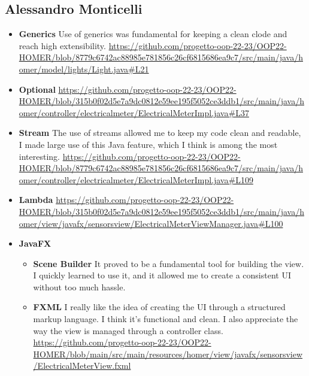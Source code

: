 \subsection {Alessandro Monticelli}
\begin{itemize}
    \item \textbf{Generics} Use of generics was fundamental for keeping a clean clode and reach high extensibility.
                            \url {https://github.com/progetto-oop-22-23/OOP22-HOMER/blob/8779c6742ac88985e781856c26cf6815686ea9c7/src/main/java/homer/model/lights/Light.java#L21}
    \item \textbf{Optional}
                            \url {https://github.com/progetto-oop-22-23/OOP22-HOMER/blob/315b0f02d5e7a9dc0812e59ee195f5052ce3ddb1/src/main/java/homer/controller/electricalmeter/ElectricalMeterImpl.java#L37}
    \item \textbf{Stream} The use of streams allowed me to keep my code clean and readable, I made large use of this Java feature, 
                            which I think is among the most interesting.
                            \url {https://github.com/progetto-oop-22-23/OOP22-HOMER/blob/8779c6742ac88985e781856c26cf6815686ea9c7/src/main/java/homer/controller/electricalmeter/ElectricalMeterImpl.java#L109}
    \item \textbf{Lambda}
                            \url {https://github.com/progetto-oop-22-23/OOP22-HOMER/blob/315b0f02d5e7a9dc0812e59ee195f5052ce3ddb1/src/main/java/homer/view/javafx/sensorsview/ElectricalMeterViewManager.java#L100}
    \item \textbf{JavaFX}
        \begin{itemize}
            \item \textbf{Scene Builder} It proved to be a fundamental tool for building the view. I quickly learned to use it, 
                                            and it allowed me to create a consistent UI without too much hassle.
            \item \textbf{FXML} I really like the idea of creating the UI through a structured markup language. I think it's functional and clean.
                                I also appreciate the way the view is managed through a controller class.
                                \url {https://github.com/progetto-oop-22-23/OOP22-HOMER/blob/main/src/main/resources/homer/view/javafx/sensorsview/ElectricalMeterView.fxml}
        \end{itemize}
\end{itemize}